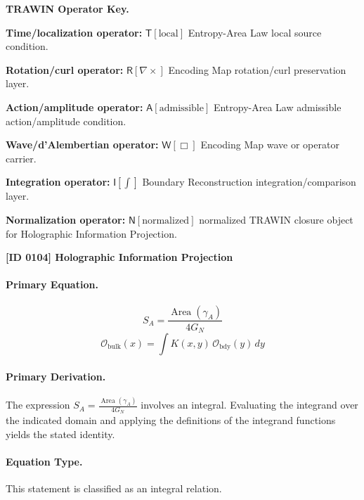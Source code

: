 \par\vspace{0.45\baselineskip}
\noindent\begin{minipage}[t]{\linewidth}
\begingroup
\small
\raggedright
\textbf{TRAWIN Operator Key.}\par
\noindent\textbf{Time/localization operator:} $\mathsf{T}\!\left[\mathrm{local}\right]$ Entropy-Area Law local source condition.\par
\noindent\textbf{Rotation/curl operator:} $\mathsf{R}\!\left[\nabla\times\right]$ Encoding Map rotation/curl preservation layer.\par
\noindent\textbf{Action/amplitude operator:} $\mathsf{A}\!\left[\mathrm{admissible}\right]$ Entropy-Area Law admissible action/amplitude condition.\par
\noindent\textbf{Wave/d'Alembertian operator:} $\mathsf{W}\!\left[\Box\right]$ Encoding Map wave or operator carrier.\par
\noindent\textbf{Integration operator:} $\mathsf{I}\!\left[\int\right]$ Boundary Reconstruction integration/comparison layer.\par
\noindent\textbf{Normalization operator:} $\mathsf{N}\!\left[\mathrm{normalized}\right]$ normalized TRAWIN closure object for Holographic Information Projection.\par
\endgroup
\end{minipage}

\clearpage
\noindent\textbf{[ID 0104] Holographic Information Projection}\par
\vspace{0.35em}
\paragraph{Primary Equation.}
\[
S_A = \frac{\operatorname{Area}(\gamma_A)}{4 G_N}
\]
\[
\mathcal{O}_{\mathrm{bulk}}(x)=\int K(x,y)\,\mathcal{O}_{\mathrm{bdy}}(y)\,dy
\]

\paragraph{Primary Derivation.}
The expression \( S_A = \frac{\operatorname{Area}(\gamma_A)}{4 G_N} \) involves an integral. Evaluating the integrand over the indicated domain and applying the definitions of the integrand functions yields the stated identity.
\paragraph{Equation Type.}
This statement is classified as an integral relation.

